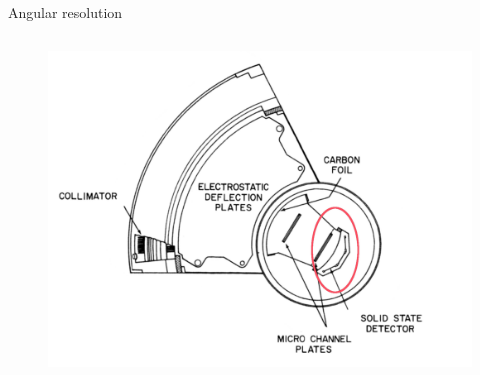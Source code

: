 \documentclass{beamer}
\begin{document}
\begin{frame}{Angular resolution}
	\vspace{-.1cm}
	\begin{columns}
		\column{4.5cm}
		\begin{figure}									
			\includegraphics[scale=0.14]{Pics/swics_sensor_flipped_rotated_ellipse.pdf}
			

\end{figure}
\end{columns}
\end{frame}
\end{document}
